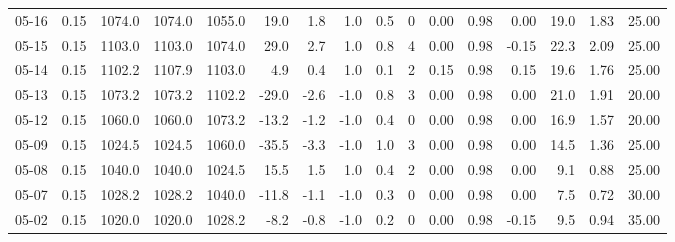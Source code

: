 \begin{threeparttable}
{\begin{tabular}{lrrrrrrrrrrrrrrr}
  05-16 &     0.15 & 1074.0 & 1074.0 & 1055.0 &       19.0 &            1.8 &                      1.0 &                 0.5 &              0 &       0.00 &      0.98 &           0.00 &             19.0 &            1.83 &                  25.00 \\
  05-15 &     0.15 & 1103.0 & 1103.0 & 1074.0 &       29.0 &            2.7 &                      1.0 &                 0.8 &              4 &       0.00 &      0.98 &          -0.15 &             22.3 &            2.09 &                  25.00 \\
  05-14 &     0.15 & 1102.2 & 1107.9 & 1103.0 &        4.9 &            0.4 &                      1.0 &                 0.1 &              2 &       0.15 &      0.98 &           0.15 &             19.6 &            1.76 &                  25.00 \\
  05-13 &     0.15 & 1073.2 & 1073.2 & 1102.2 &      -29.0 &           -2.6 &                     -1.0 &                 0.8 &              3 &       0.00 &      0.98 &           0.00 &             21.0 &            1.91 &                  20.00 \\
  05-12 &     0.15 & 1060.0 & 1060.0 & 1073.2 &      -13.2 &           -1.2 &                     -1.0 &                 0.4 &              0 &       0.00 &      0.98 &           0.00 &             16.9 &            1.57 &                  20.00 \\
  05-09 &     0.15 & 1024.5 & 1024.5 & 1060.0 &      -35.5 &           -3.3 &                     -1.0 &                 1.0 &              3 &       0.00 &      0.98 &           0.00 &             14.5 &            1.36 &                  25.00 \\
  05-08 &     0.15 & 1040.0 & 1040.0 & 1024.5 &       15.5 &            1.5 &                      1.0 &                 0.4 &              2 &       0.00 &      0.98 &           0.00 &              9.1 &            0.88 &                  25.00 \\
  05-07 &     0.15 & 1028.2 & 1028.2 & 1040.0 &      -11.8 &           -1.1 &                     -1.0 &                 0.3 &              0 &       0.00 &      0.98 &           0.00 &              7.5 &            0.72 &                  30.00 \\
  05-02 &     0.15 & 1020.0 & 1020.0 & 1028.2 &       -8.2 &           -0.8 &                     -1.0 &                 0.2 &              0 &       0.00 &      0.98 &          -0.15 &              9.5 &            0.94 &                  35.00 \\

\end{tabular}}
\end{threeparttable}
